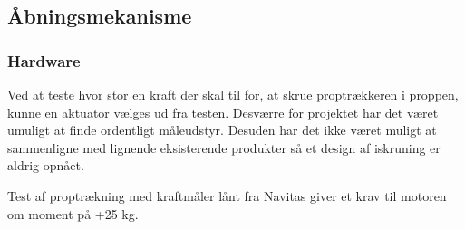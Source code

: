 \subsection{Åbningsmekanisme}
\subsubsection{Hardware}
Ved at teste hvor stor en kraft der skal til for, at skrue proptrækkeren i proppen, kunne en aktuator vælges ud fra testen. Desværre for projektet har det været umuligt at finde ordentligt måleudstyr. Desuden har det ikke været muligt at sammenligne med lignende eksisterende produkter så et design af iskruning er aldrig opnået.

Test af proptrækning med kraftmåler lånt fra Navitas giver et krav til motoren om moment på +25 kg.